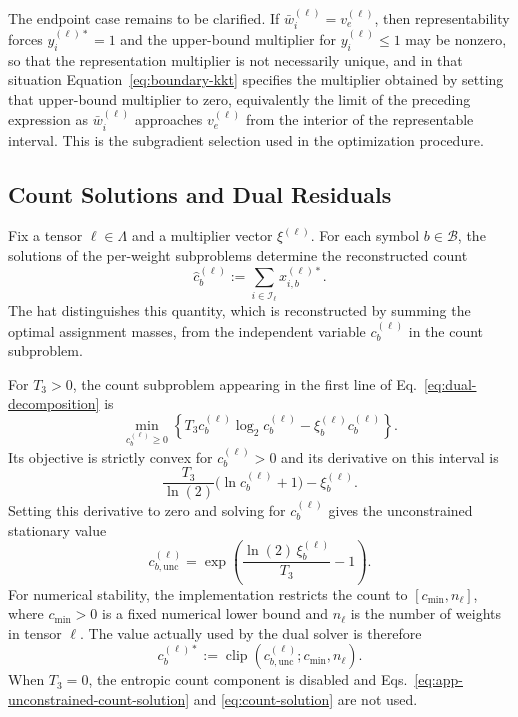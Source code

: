 \documentclass{article}
\begin{document}
The endpoint case remains to be clarified. If
$\bar w_i^{(\ell)}=v_e^{(\ell)}$, then representability forces
$y_i^{(\ell)*}=1$ and the upper-bound multiplier for $y_i^{(\ell)}\leq1$ may be
nonzero, so that the representation multiplier is not necessarily unique, and in
that situation Equation~\eqref{eq:boundary-kkt} specifies the multiplier
obtained by setting that upper-bound multiplier to zero, equivalently the limit
of the preceding expression as $\bar w_i^{(\ell)}$ approaches
$v_e^{(\ell)}$ from the interior of the representable interval. This is the
subgradient selection used in the optimization procedure.


\subsection{Count Solutions and Dual Residuals}
\label{app:count-solutions}

Fix a tensor $\ell\in\Lambda$ and a multiplier vector $\xi^{(\ell)}$. For each
symbol $b\in\mathcal B$, the solutions of the per-weight subproblems determine
the reconstructed count
\begin{equation}
  \widehat c_b^{(\ell)}
  :=
  \sum_{i\in\mathcal I_\ell}x_{i,b}^{(\ell)*}.
  \label{eq:app-reconstructed-count}
\end{equation}
The hat distinguishes this quantity, which is reconstructed by summing the
optimal assignment masses, from the independent variable $c_b^{(\ell)}$ in
the count subproblem.

For $T_3>0$, the count subproblem appearing in the first line of
Eq.~\eqref{eq:dual-decomposition} is
\[
  \min_{c_b^{(\ell)}\geq0}
  \left\{
    T_3c_b^{(\ell)}\log_2c_b^{(\ell)}
    -\xi_b^{(\ell)}c_b^{(\ell)}
  \right\}.
\]
Its objective is strictly convex for $c_b^{(\ell)}>0$ and its derivative on this interval is
\[
  \frac{T_3}{\ln(2)}\bigl(\ln c_b^{(\ell)}+1\bigr)
  -\xi_b^{(\ell)}.
\]
Setting this derivative to zero and solving for $c_b^{(\ell)}$ gives the
unconstrained stationary value
\begin{equation}
  c_{b,\mathrm{unc}}^{(\ell)}
  =
  \exp\!\left(
    \frac{\ln(2)\,\xi_b^{(\ell)}}{T_3}-1
  \right).
  \label{eq:app-unconstrained-count-solution}
\end{equation}
For numerical stability, the implementation restricts the count to
$[c_{\min},n_\ell]$, where $c_{\min}>0$ is a fixed numerical lower bound and
$n_\ell$ is the number of weights in tensor $\ell$. The value actually used by
the dual solver is therefore
\begin{equation}
  c_b^{(\ell)*}
  :=
  \operatorname{clip}\!\left(
    c_{b,\mathrm{unc}}^{(\ell)};
    c_{\min},n_\ell
  \right).
  \label{eq:count-solution}
\end{equation}
When $T_3=0$, the entropic count component is disabled and
Eqs.~\eqref{eq:app-unconstrained-count-solution} and
\eqref{eq:count-solution} are not used.
\end{document}
